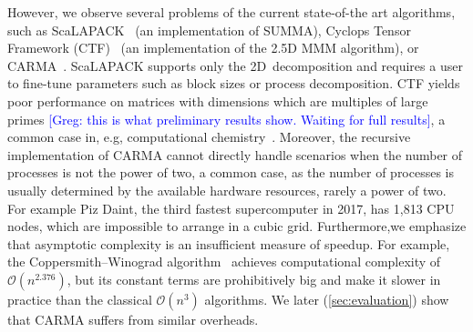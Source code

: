 \documentclass[sigplan,review,anonymous]{acmart}\settopmatter{printfolios=true,printccs=false,printacmref=false}
\newcommand\greg[1]{\textcolor{blue}{[Greg: #1]}}
\newcommand\mac[1]{\textcolor{red}{[Mac: #1]}}
\begin{document}

%

However, we observe several problems of the current state-of-the art
algorithms, such as ScaLAPACK~\cite{scalapack} (an implementation of
SUMMA), Cyclops Tensor Framework (CTF)~\cite{cyclops} (an implementation of the 
2.5D MMM algorithm), or CARMA~\cite{CARMA}. ScaLAPACK supports
only the 2D~decomposition  and requires a user to
fine-tune parameters such as block sizes or process
decomposition. CTF yields poor performance on matrices with 
dimensions which are multiples of large primes
\greg{this is what preliminary results show. Waiting for full results}, a 
common case in, e.g,
computational chemistry~\cite{joost}. Moreover, the recursive
implementation of CARMA cannot directly handle scenarios when the number of
processes is not the power of two, a common
case, as the number of processes is usually determined by the available
hardware resources, rarely a power of two.  For example Piz Daint, the
third fastest supercomputer in 2017, has 1,813 CPU nodes, which are
impossible to arrange in a cubic grid. Furthermore,we emphasize that asymptotic 
complexity is an insufficient measure of speedup. For example, the
Coppersmith--Winograd algorithm~\cite{coppersmith} achieves computational
complexity of $\mathcal{O}(n^{2.376})$, but its constant terms are 
prohibitively big and
make it slower in practice than the classical $\mathcal{O}(n^{3})$ algorithms. 
We later (\cref{sec:evaluation}) show that CARMA suffers from similar
overheads.




\end{document}
